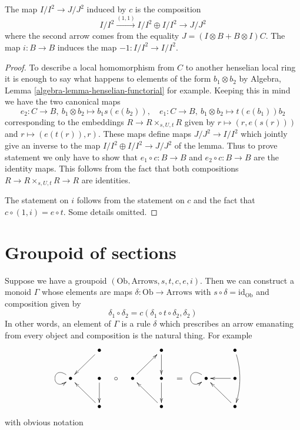 \begin{lemma}
\label{lemma-first-order-structure-c}
The map $I/I^2 \to J/J^2$ induced by $c$ is the composition
$$
I/I^2 \xrightarrow{(1, 1)} I/I^2 \oplus I/I^2 \to J/J^2
$$
where the second arrow comes from the equality
$J = (I \otimes B + B \otimes I)C$.
The map $i : B \to B$ induces the map $-1 : I/I^2 \to I/I^2$.
\end{lemma}

\begin{proof}
To describe a local homomorphism from $C$ to another
henselian local ring it is enough to say what happens
to elements of the form $b_1 \otimes b_2$ by
Algebra, Lemma \ref{algebra-lemma-henselian-functorial}
for example. Keeping this in mind we have the two canonical maps
$$
e_2 : C \to B,\ b_1 \otimes b_2 \mapsto b_1s(e(b_2)),\quad
e_1 : C \to B,\ b_1 \otimes b_2 \mapsto t(e(b_1))b_2
$$
corresponding to the embeddings
$R \to R \times_{s, U, t} R$ given by
$r \mapsto (r, e(s(r)))$ and $r \mapsto (e(t(r)), r)$.
These maps define maps $J/J^2 \to I/I^2$ which jointly
give an inverse to the map $I/I^2 \oplus I/I^2 \to J/J^2$
of the lemma. Thus to prove statement we only have to show
that $e_1 \circ c : B \to B$ and $e_2 \circ c : B \to B$
are the identity maps. This follows from the fact that both
compositions $R \to R \times_{s, U, t} R \to R$ are identities.

\medskip\noindent
The statement on $i$ follows from the statement on $c$ and the
fact that $c \circ (1, i) = e \circ t$. Some details omitted.
\end{proof}








\section{Groupoid of sections}
\label{section-groupoid-sections}

\noindent
Suppose we have a groupoid $(\text{Ob}, \text{Arrows}, s, t, c, e, i)$.
Then we can construct a monoid $\Gamma$ whose elements are
maps $\delta : \text{Ob} \to \text{Arrows}$ with
$s \circ \delta = \text{id}_{\text{Ob}}$ and composition given by
$$
\delta_1 \circ \delta_2 = c(\delta_1 \circ t \circ \delta_2, \delta_2)
$$
In other words, an element of $\Gamma$ is a rule $\delta$ which
prescribes an arrow emanating from every object and composition
is the natural thing. For example
$$
\vcenter{
\xymatrix{
& \bullet \ar[dl] \\
\bullet \ar@(ul, dl)[] & \bullet \ar[d] \\
& \bullet \ar[lu]
}
}
\quad\circ\quad
\vcenter{
\xymatrix{
& \bullet \ar[d] \\
\bullet \ar[ru] & \bullet \ar[d] \\
& \bullet \ar[lu]
}
}
\quad = \quad\quad
\vcenter{
\xymatrix{
& \bullet \ar@/^/[dd] \\
\bullet \ar@(ul, dl)[] & \bullet \ar[l] \\
& \bullet \ar[lu]
}
}
$$
with obvious notation

